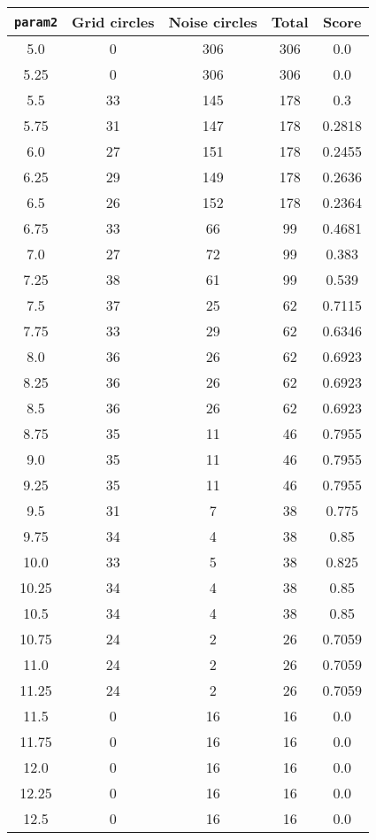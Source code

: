 \documentclass[letterpaper, 12pt]{article}
\begin{document}
\begin{longtable}{|c|c|c|c|c|}
\hline
\textbf{\texttt{param2}} & \textbf{Grid circles} & \textbf{Noise circles} & \textbf{Total} & \textbf{Score} \\
\hline
5.0 & 0 & 306 & 306 & 0.0 \\
\hline
5.25 & 0 & 306 & 306 & 0.0 \\
\hline
5.5 & 33 & 145 & 178 & 0.3 \\
\hline
5.75 & 31 & 147 & 178 & 0.2818 \\
\hline
6.0 & 27 & 151 & 178 & 0.2455 \\
\hline
6.25 & 29 & 149 & 178 & 0.2636 \\
\hline
6.5 & 26 & 152 & 178 & 0.2364 \\
\hline
6.75 & 33 & 66 & 99 & 0.4681 \\
\hline
7.0 & 27 & 72 & 99 & 0.383 \\
\hline
7.25 & 38 & 61 & 99 & 0.539 \\
\hline
7.5 & 37 & 25 & 62 & 0.7115 \\
\hline
7.75 & 33 & 29 & 62 & 0.6346 \\
\hline
8.0 & 36 & 26 & 62 & 0.6923 \\
\hline
8.25 & 36 & 26 & 62 & 0.6923 \\
\hline
8.5 & 36 & 26 & 62 & 0.6923 \\
\hline
8.75 & 35 & 11 & 46 & 0.7955 \\
\hline
9.0 & 35 & 11 & 46 & 0.7955 \\
\hline
9.25 & 35 & 11 & 46 & 0.7955 \\
\hline
9.5 & 31 & 7 & 38 & 0.775 \\
\hline
9.75 & 34 & 4 & 38 & 0.85 \\
\hline
10.0 & 33 & 5 & 38 & 0.825 \\
\hline
10.25 & 34 & 4 & 38 & 0.85 \\
\hline
10.5 & 34 & 4 & 38 & 0.85 \\
\hline
10.75 & 24 & 2 & 26 & 0.7059 \\
\hline
11.0 & 24 & 2 & 26 & 0.7059 \\
\hline
11.25 & 24 & 2 & 26 & 0.7059 \\
\hline
11.5 & 0 & 16 & 16 & 0.0 \\
\hline
11.75 & 0 & 16 & 16 & 0.0 \\
\hline
12.0 & 0 & 16 & 16 & 0.0 \\
\hline
12.25 & 0 & 16 & 16 & 0.0 \\
\hline
12.5 & 0 & 16 & 16 & 0.0 \\

\end{longtable}
\end{document}
